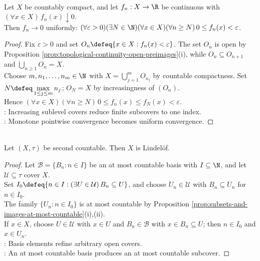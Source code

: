 \begin{theorem} \label{thm:dini-countably-compact} \\
Let $X$ be countably compact, and let $f_n:X\to\R$ be continuous with $(\forall x\in X)\,f_n(x)\downarrow0$.\\
Then $f_n\to0$ uniformly: $(\forall\varepsilon>0)(\exists N\in\N)(\forall x\in X)(\forall n\geq N)\,0\leq f_n(x)<\varepsilon$.
\begin{proof} Fix $\varepsilon>0$ and set $O_n\defeq\{x\in X:f_n(x)<\varepsilon\}$. The set $O_n$ is open by Proposition \ref{prop:topological-continuity-open-preimages}(i), while $O_n\subseteq O_{n+1}$ and $\bigcup\limits_{n\geq1}O_n=X$.\\
Choose $m,n_1,\ldots,n_m\in\N$ with $X=\bigcup\limits_{j=1}^m O_{n_j}$ by countable compactness. Set $N\defeq\max\limits_{1\leq j\leq m}n_j$; $O_N=X$ by increasingness of $(O_n)$.\\
Hence $(\forall x\in X)(\forall n\geq N)\,0\leq f_n(x)\leq f_N(x)<\varepsilon$.\\
: Increasing sublevel covers reduce finite subcovers to one index.\\
: Monotone pointwise convergence becomes uniform convergence.
\end{proof}
\end{theorem}

\begin{proposition} \label{prop:second-countable-implies-lindelof} \\
Let $(X,\tau)$ be second countable. Then $X$ is Lindel\"of.
\begin{proof} Let $\mathcal{B}=\{B_n:n\in I\}$ be an at most countable basis with $I\subseteq\N$, and let $\mathcal{U}\subseteq\tau$ cover $X$.\\
Set $I_0\defeq\{n\in I:(\exists U\in\mathcal{U})\,B_n\subseteq U\}$, and choose $U_n\in\mathcal{U}$ with $B_n\subseteq U_n$ for $n\in I_0$.\\
The family $\{U_n:n\in I_0\}$ is at most countable by Proposition \ref{prop:subsets-and-images-at-most-countable}(i),(ii).\\
If $x\in X$, choose $U\in\mathcal{U}$ with $x\in U$ and $B_n\in\mathcal{B}$ with $x\in B_n\subseteq U$; then $n\in I_0$ and $x\in U_n$.\\
: Basis elements refine arbitrary open covers.\\
: An at most countable basis produces an at most countable subcover.
\end{proof}
\end{proposition}

